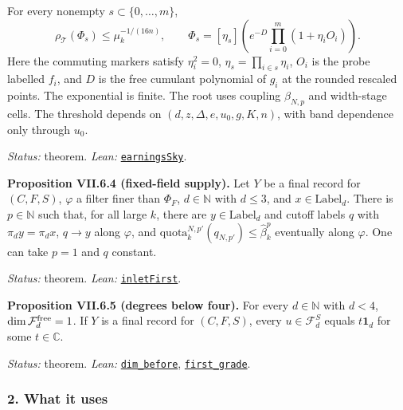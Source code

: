 \documentclass[
  letterpaper,
  11pt]{article}
\newcounter{none} %
\begin{document}
For every nonempty \(s\subset\{0,\ldots,m\}\),
\[\rho_{\mathcal T}(\Phi_s)\le\mu_k^{-1/(16n)},\qquad \Phi_s=[\eta_s]\left(e^{-D}\prod_{i=0}^m(1+\eta_iO_i)\right).\]
Here the commuting markers satisfy \(\eta_i^2=0\),
\(\eta_s=\prod_{i\in s}\eta_i\), \(O_i\) is the probe labelled \(f_i\),
and \(D\) is the free cumulant polynomial of \(g_i\) at the rounded
rescaled points. The exponential is finite. The root uses coupling
\(\beta_{N,p}\) and width-stage cells. The threshold depends on
\((d,z,\Delta,e,u_0,g,K,n)\), with band dependence only through \(u_0\).

\emph{Status:} theorem. \emph{Lean:}
\href{https://github.com/yang-mills-group/OpenAI-YM-20261028/blob/3456e5e75cf8d4cd558955a5c7638fba2d68f464/YM/TraceExtension/Prom/Front/West/Tael.lean\#L56-L91}{\texttt{earningsSky}}.

\textbf{Proposition VII.6.4 (fixed-field supply).} Let \(Y\) be a final
record for \((C,F,S)\), \(\varphi\) a filter finer than \(\Phi_F\),
\(d\in\mathbb N\) with \(d\le3\), and \(x\in\mathrm{Label}_d\). There is
\(p\in\mathbb N\) such that, for all large \(k\), there are
\(y\in\mathrm{Label}_d\) and cutoff labels \(q\) with \(\pi_dy=\pi_dx\),
\(q\to y\) along \(\varphi\), and
\(\mathrm{quota}_k^{N,p'}(q_{N,p'})\le\hat\beta_k^p\) eventually along
\(\varphi\). One can take \(p=1\) and \(q\) constant.

\emph{Status:} theorem. \emph{Lean:}
\href{https://github.com/yang-mills-group/OpenAI-YM-20261028/blob/3456e5e75cf8d4cd558955a5c7638fba2d68f464/YM/SharpGram/Clauses.lean\#L126-L129}{\texttt{inletFirst}}.

\textbf{Proposition VII.6.5 (degrees below four).} For every
\(d\in\mathbb N\) with \(d<4\), \(\dim\mathcal F^{\rm free}_d=1\). If
\(Y\) is a final record for \((C,F,S)\), every \(u\in\mathcal F^S_d\)
equals \(t\mathbf1_d\) for some \(t\in\mathbb C\).

\emph{Status:} theorem. \emph{Lean:}
\href{https://github.com/yang-mills-group/OpenAI-YM-20261028/blob/3456e5e75cf8d4cd558955a5c7638fba2d68f464/YM/UVNext/FREE_STRESS_CERTIFICATE/Size.lean\#L51-L54}{\texttt{dim\_before}},
\href{https://github.com/yang-mills-group/OpenAI-YM-20261028/blob/3456e5e75cf8d4cd558955a5c7638fba2d68f464/YM/Trace2/Transfer.lean\#L31-L37}{\texttt{first\_grade}}.

\subsubsection{2. What it uses}\label{what-it-uses-30}
\end{document}
